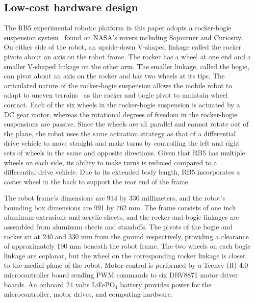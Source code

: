 \documentclass[lettersize,journal,twoside]{IEEEtran}
\theoremstyle{definition}
\begin{document}
\subsection{Low-cost hardware design}
\label{sec:md}
\noindent
The RB5 experimental robotic platform in this paper adopts a rocker-bogie suspension system~\cite{bickler1989articulated} found on NASA's rovers including Sojourner and Curiosity. On either side of the robot, an upside-down V-shaped linkage called the rocker pivots about an axis on the robot frame. The rocker has a wheel at one end and a smaller V-shaped linkage on the other arm. The smaller linkage, called the bogie, can pivot about an axis on the rocker and has two wheels at its tips. The articulated nature of the rocker-bogie suspension allows the mobile robot to adapt to uneven terrains~\cite{%
faisal2021low} as the rocker and bogie pivot to maintain wheel contact.%
%
Each of the six wheels in the rocker-bogie suspension is actuated by a DC gear motor, whereas the rotational degrees of freedom in the rocker-bogie suspensions are passive. Since the wheels are all parallel and cannot rotate out of the plane, the robot uses the same actuation strategy as that of a differential drive vehicle to move straight and make turns by controlling the left and right sets of wheels in the same and opposite directions. Given that RB5 has multiple wheels on each side, its ability to make turns is reduced compared to a differential drive vehicle. Due to its extended body length, RB5 incorporates a caster wheel in the back to support the rear end of the frame.

The robot frame's dimensions are 914 by 330 millimeters, and the robot's bounding box dimensions are 991 by 762 mm. The frame consists of one inch aluminum extrusions and acrylic sheets, and the rocker and bogie linkages are assembled from aluminum sheets and standoffs. The pivots of the bogie and rocker sit at 240 and 330 mm from the ground respectively, providing a clearance of approximately 190 mm beneath the robot frame. The two wheels on each bogie linkage are coplanar, but the wheel on the corresponding rocker linkage is closer to the medial plane of the robot. Motor control is performed by a Teensy (R) 4.0 microcontroller board sending PWM commands to six DRV8871 motor driver boards. An onboard 24 volts LiFePO${}_\text{4}$ battery provides power for the microcontroller, motor drives, and computing hardware.
\end{document}
